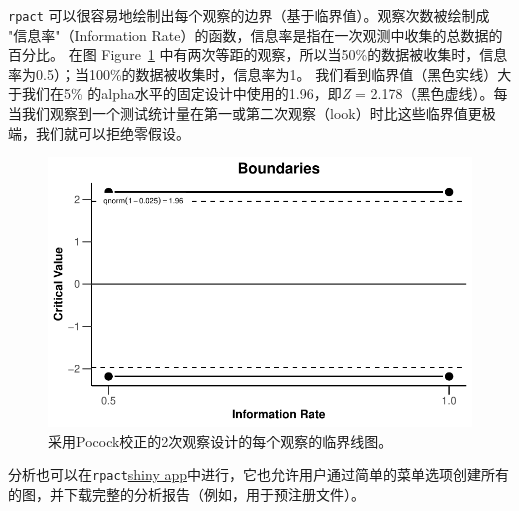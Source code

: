 \documentclass[
  letterpaper,
  DIV=11,
  numbers=noendperiod]{scrreprt}
\begin{document}
\texttt{rpact}
可以很容易地绘制出每个观察的边界（基于临界值）。观察次数被绘制成
"信息率"（Information
Rate）的函数，信息率是指在一次观测中收集的总数据的百分比。 在图
Figure~\ref{fig-boundplot1}
中有两次等距的观察，所以当50\%的数据被收集时，信息率为0.5）；当100\%的数据被收集时，信息率为1。
我们看到临界值（黑色实线）大于我们在5\%
的alpha水平的固定设计中使用的1.96，即\emph{Z} =
2.178（黑色虚线）。每当我们观察到一个测试统计量在第一或第二次观察（look）时比这些临界值更极端，我们就可以拒绝零假设。

\begin{figure}

{\centering \includegraphics[width=1\textwidth,height=\textheight]{10-sequential_files/figure-pdf/fig-boundplot1-1.pdf}

}

\caption{\label{fig-boundplot1}采用Pocock校正的2次观察设计的每个观察的临界线图。}

\end{figure}

分析也可以在\texttt{rpact}\href{https://rpact.shinyapps.io/public/}{shiny
app}中进行，它也允许用户通过简单的菜单选项创建所有的图，并下载完整的分析报告（例如，用于预注册文件）。
\end{document}
